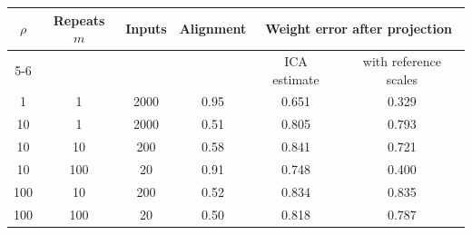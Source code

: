 \footnotesize
\setlength{\tabcolsep}{4pt}
\begin{tabular}{@{}cccccc@{}}
\toprule
$\rho$ & Repeats $m$ & Inputs & Alignment & \multicolumn{2}{c}{Weight error after projection} \\
\cmidrule(l){5-6}
& & & & ICA estimate & with reference scales \\
\midrule
1 & 1 & 2000 & 0.95 & 0.651 & 0.329 \\
10 & 1 & 2000 & 0.51 & 0.805 & 0.793 \\
10 & 10 & 200 & 0.58 & 0.841 & 0.721 \\
10 & 100 & 20 & 0.91 & 0.748 & 0.400 \\
100 & 10 & 200 & 0.52 & 0.834 & 0.835 \\
100 & 100 & 20 & 0.50 & 0.818 & 0.787 \\
\bottomrule
\end{tabular}